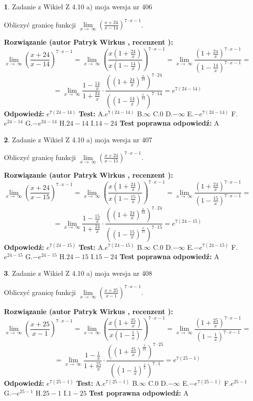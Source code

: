 \documentclass[12pt, a4paper]{article}
\theoremstyle{definition} %
\newtheorem{zad}{}
\newcommand{\zadStart}[1]{\begin{zad}#1\newline}
\newcommand{\zadStop}{\end{zad}}
\newcommand{\rozwStart}[2]{\noindent \textbf{Rozwiązanie (autor #1 , recenzent #2): }\newline}
\newcommand{\rozwStop}{\newline}
\newcommand{\odpStart}{\noindent \textbf{Odpowiedź:}\newline}
\newcommand{\odpStop}{\newline}
\newcommand{\testStart}{\noindent \textbf{Test:}\newline}
\newcommand{\testStop}{\newline}
\newcommand{\kluczStart}{\noindent \textbf{Test poprawna odpowiedź:}\newline}
\newcommand{\kluczStop}{\newline}
\begin{document}
\zadStart{Zadanie z Wikieł Z 4.10 a) moja wersja nr 406}


Obliczyć granicę funkcji  $\lim\limits_{x\to\ \infty}(\frac{x+24}{x-14})^{7\cdot x-1}$.
\zadStop
\rozwStart{Patryk Wirkus}{}
$$\lim\limits_{x\to\ \infty}(\frac{x+24}{x-14})^{7\cdot x-1} = \lim\limits_{x\to\ \infty}(\frac{x(1+\frac{24}{x})}{x(1-\frac{14}{x})})^{7\cdot x-1}=\lim\limits_{x\to\ \infty}\frac{(1+\frac{24}{x})^{7\cdot x-1}}{(1-\frac{14}{x})^{7\cdot x-1}}=$$
$$=\lim\limits_{x\to\ \infty}\frac{1-\frac{14}{x}}{1+\frac{24}{x}}\cdot\frac{((1+\frac{24}{x})^{\frac{x}{24}})^{7\cdot24}}{((1-\frac{14}{x})^{\frac{x}{14}})^{7\cdot14}}=e^{7(24-14)}$$
\rozwStop
\odpStart
$e^{7(24-14)}$
\odpStop
\testStart
A.$e^{7(24-14)}$ B.$\infty$ C.$0$ D.$-\infty$ E.$-e^{7(24-14)}$
F.$e^{24-14}$ G.$-e^{24-14}$
H.$24-14$
I.$14-24$
\testStop
\kluczStart
A
\kluczStop



\zadStart{Zadanie z Wikieł Z 4.10 a) moja wersja nr 407}


Obliczyć granicę funkcji  $\lim\limits_{x\to\ \infty}(\frac{x+24}{x-15})^{7\cdot x-1}$.
\zadStop
\rozwStart{Patryk Wirkus}{}
$$\lim\limits_{x\to\ \infty}(\frac{x+24}{x-15})^{7\cdot x-1} = \lim\limits_{x\to\ \infty}(\frac{x(1+\frac{24}{x})}{x(1-\frac{15}{x})})^{7\cdot x-1}=\lim\limits_{x\to\ \infty}\frac{(1+\frac{24}{x})^{7\cdot x-1}}{(1-\frac{15}{x})^{7\cdot x-1}}=$$
$$=\lim\limits_{x\to\ \infty}\frac{1-\frac{15}{x}}{1+\frac{24}{x}}\cdot\frac{((1+\frac{24}{x})^{\frac{x}{24}})^{7\cdot24}}{((1-\frac{15}{x})^{\frac{x}{15}})^{7\cdot15}}=e^{7(24-15)}$$
\rozwStop
\odpStart
$e^{7(24-15)}$
\odpStop
\testStart
A.$e^{7(24-15)}$ B.$\infty$ C.$0$ D.$-\infty$ E.$-e^{7(24-15)}$
F.$e^{24-15}$ G.$-e^{24-15}$
H.$24-15$
I.$15-24$
\testStop
\kluczStart
A
\kluczStop



\zadStart{Zadanie z Wikieł Z 4.10 a) moja wersja nr 408}


Obliczyć granicę funkcji  $\lim\limits_{x\to\ \infty}(\frac{x+25}{x-1})^{7\cdot x-1}$.
\zadStop
\rozwStart{Patryk Wirkus}{}
$$\lim\limits_{x\to\ \infty}(\frac{x+25}{x-1})^{7\cdot x-1} = \lim\limits_{x\to\ \infty}(\frac{x(1+\frac{25}{x})}{x(1-\frac{1}{x})})^{7\cdot x-1}=\lim\limits_{x\to\ \infty}\frac{(1+\frac{25}{x})^{7\cdot x-1}}{(1-\frac{1}{x})^{7\cdot x-1}}=$$
$$=\lim\limits_{x\to\ \infty}\frac{1-\frac{1}{x}}{1+\frac{25}{x}}\cdot\frac{((1+\frac{25}{x})^{\frac{x}{25}})^{7\cdot25}}{((1-\frac{1}{x})^{\frac{x}{1}})^{7\cdot1}}=e^{7(25-1)}$$
\rozwStop
\odpStart
$e^{7(25-1)}$
\odpStop
\testStart
A.$e^{7(25-1)}$ B.$\infty$ C.$0$ D.$-\infty$ E.$-e^{7(25-1)}$
F.$e^{25-1}$ G.$-e^{25-1}$
H.$25-1$
I.$1-25$
\testStop
\kluczStart
A
\kluczStop
\end{document}

